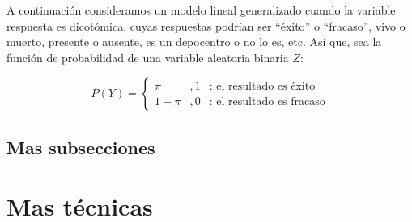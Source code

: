 A continuación consideramos un modelo lineal generalizado cuando la variable respuesta es dicotómica, cuyas respuestas podrían ser ``éxito'' o ``fracaso'', vivo o muerto, presente o ausente, es un depocentro o no lo es, etc. Así que, sea la función de probabilidad de una variable aleatoria binaria $Z$:

\[ 
P(Y)=\left\{ \begin{array}{ccl}
\pi &, 1 & \textrm{: el resultado es éxito}\\
1-\pi &, 0 & \textrm{: el resultado es fracaso} \end{array} \right.
\]
\subsection{Mas subsecciones}

\blindtext

\section{Mas técnicas}

\blindtext


